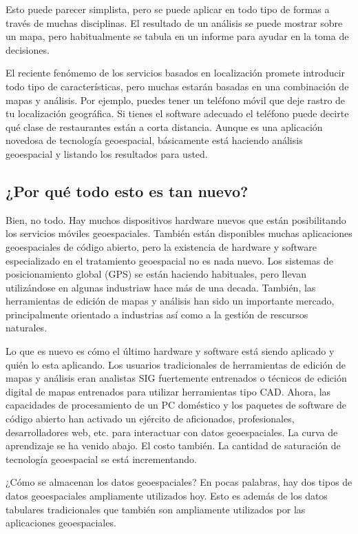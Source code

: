 Esto puede parecer simplista, pero se puede aplicar en todo tipo de
formas a través de muchas disciplinas. El resultado de un análisis se puede 
mostrar sobre un mapa, pero habitualmente se tabula en un informe para ayudar 
en la toma de decisiones.

El reciente fenómemo de los servicios basados en localización promete 
introducir todo tipo de características, pero muchas estarán basadas en una
combinación de mapas y análisis. Por ejemplo, puedes tener un teléfono móvil
que deje rastro de tu localización geográfica. Si tienes el software adecuado
el teléfono puede decirte qué clase de restaurantes están a corta distancia. 
Aunque es una aplicación novedosa de tecnología geoespacial, básicamente 
está haciendo análisis geoespacial y listando los resultados para usted.

\subsection{¿Por qué todo esto es tan nuevo?}\label{label_whynew}

Bien, no todo. Hay muchos dispositivos hardware nuevos que están posibilitando
los servicios móviles geoespaciales. También están disponibles muchas 
aplicaciones geoespaciales de código abierto, pero la existencia de hardware y 
software especializado en el tratamiento geoespacial no es nada nuevo.
Los sistemas de posicionamiento global (GPS) se están haciendo habituales, pero llevan
utilizándose en algunas industriaw hace más de una decada. También, las herramientas
de edición de mapas y análisis han sido un importante mercado, principalmente 
orientado a industrias así como a la gestión de rescursos naturales.

Lo que es nuevo es cómo el último hardware y software está siendo aplicado
y quién lo esta aplicando. Los usuarios tradicionales de herramientas de 
edición de mapas y análisis eran analistas SIG fuertemente entrenados o 
técnicos de edición digital de mapas entrenados para utilizar herramientas tipo CAD. 
Ahora, las capacidades de procesamiento de un PC doméstico y los paquetes de software 
de código abierto han activado un ejército de aficionados, profesionales,
desarrolladores web, etc. para interactuar con datos geoespaciales. La curva 
de aprendizaje se ha venido abajo. El costo también. La cantidad de saturación 
de tecnología geoespacial se está incrementando.

¿Cómo se almacenan los datos geoespaciales? En pocas palabras, hay dos tipos
de datos geoespaciales ampliamente utilizados hoy. Esto es además de los datos 
tabulares tradicionales que también son ampliamente utilizados por las
aplicaciones geoespaciales.

